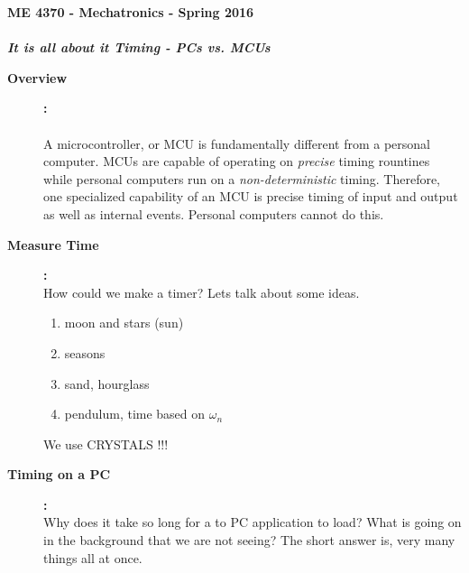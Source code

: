 \documentclass[11pt]{article}
\begin{document}
    
	\textbf{\LARGE ME 4370 - Mechatronics - Spring 2016}\\\\
	\textbf{\LARGE {\it It is all about it Timing - PCs vs. MCUs}}\\
	    \begin{description}
        \item[\textbf{Overview}]\textbf{:}\\\\
        
            A microcontroller, or MCU is fundamentally different from a personal computer. MCUs are capable of operating on {\it precise} timing rountines while personal computers run on a {\it non-deterministic} timing. Therefore, one specialized capability of an MCU is precise timing of input and output as well as internal events. Personal computers cannot do this. 
        
        \item[\textbf{Measure Time}]\textbf{:}\\    
            
            How could we make a timer? Lets talk about some ideas. 
                \begin{enumerate}
                    \item moon and stars (sun)
                    \item seasons
                    \item sand, hourglass
                    \item pendulum, time based on $\omega_n$ 
                \end{enumerate}
            
            We use CRYSTALS !!! 
            
        \item[\textbf{Timing on a PC}]\textbf{:}\\  
            Why does it take so long for a to PC application to load? What is going on in the background that we are not seeing? The short answer is, very many things all at once. 
        
    \end{description}
\end{document}
